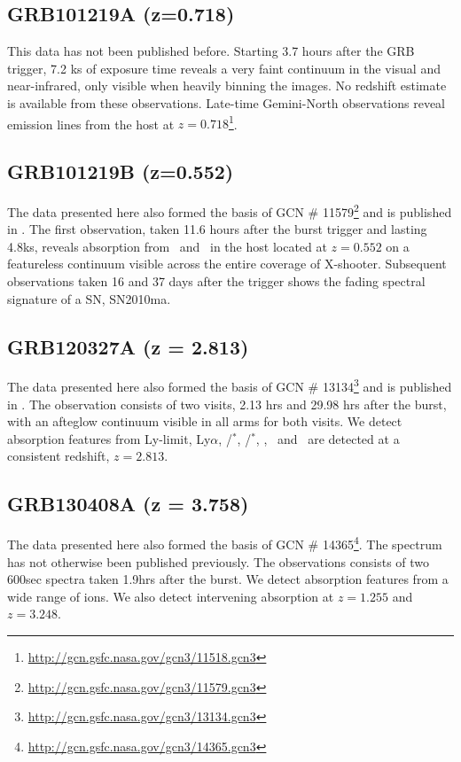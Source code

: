 \documentclass[iop, twocolappendix, numberedappendix, tighten, appendixfloats]{emulateapj}
\newcommand{\lya}{Ly$\alpha$}
\newcommand{\feii}{\ion{Fe}{2}}
\newcommand{\cii}{\ion{C}{2}}
\newcommand{\mgi}{\ion{Mg}{1}}
\newcommand{\mgii}{\ion{Mg}{2}}
\newcommand{\ali}{\ion{Al}{1}}
\newcommand{\SIii}{\ion{Si}{2}}
\begin{document}
	\subsection{GRB101219A (z=0.718)}
	This data has not been published before. Starting 3.7 hours after the GRB
	trigger, 7.2 ks of exposure time reveals a very faint continuum in the visual
	and near-infrared, only visible when heavily binning the images. No redshift
	estimate is available from these observations.  Late-time Gemini-North
	observations reveal emission lines from the host at
	$z=0.718$\footnote{\url{http://gcn.gsfc.nasa.gov/gcn3/11518.gcn3}}.

	\subsection{GRB101219B (z=0.552)}
	The data presented here also formed the basis of GCN \#
	11579\footnote{\url{http://gcn.gsfc.nasa.gov/gcn3/11579.gcn3}} and is published
	in \citet{Sparre2011}.	The first observation, taken 11.6 hours after the burst
	trigger and lasting 4.8ks, reveals absorption from \mgii~and \mgi~in the host
	located at $z = 0.552$ on a featureless continuum visible across the entire
	coverage of X-shooter.  Subsequent observations taken 16 and 37 days after the
	trigger shows the fading spectral signature of a SN, SN2010ma.
	
	
	\subsection{GRB120327A (z = 2.813)}
	The data presented here also formed the basis of GCN \#
	13134\footnote{\url{http://gcn.gsfc.nasa.gov/gcn3/13134.gcn3}} and is published
	in \citet{DElia2014}. The observation consists of two visits, 2.13 hrs and
	29.98 hrs after the burst, with an afteglow continuum visible in all arms for
	both visits. We detect absorption features from Ly-limit, \lya, \cii/\cii$^*$,
	\SIii/\SIii$^*$, \ali, \feii ~and \mgii ~are detected at a consistent redshift,
	$z = 2.813$.

    \subsection{GRB130408A (z = 3.758)}
	The data presented here also formed the basis of GCN \#
	14365\footnote{\url{http://gcn.gsfc.nasa.gov/gcn3/14365.gcn3}}. The spectrum
	has not otherwise been published previously. The observations consists of two
	600sec spectra taken 1.9hrs after the burst. We detect absorption features from
	a wide range of ions. We also detect intervening absorption at $z=1.255$ and
	$z=3.248$.
	
\end{document}
